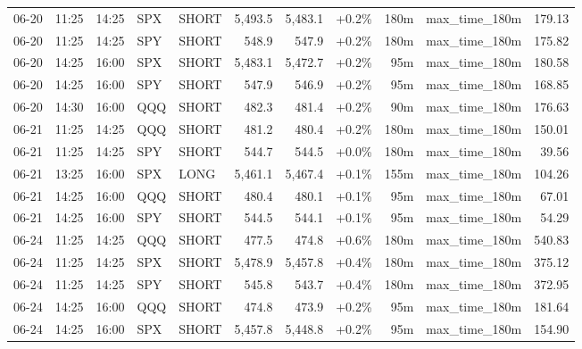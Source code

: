 \documentclass[11pt,a4paper,twoside]{article}
\begin{document}
\begin{center}
\begin{longtable}{>{\color{txtmain}}l l l l l r r r r >{\color{txtmain}}l r}
06-20 & 11:25 & 14:25 & SPX & SHORT & 5,493.5 & 5,483.1 & \textcolor{wingreen}{+0.2\%} & 180m & max\_time\_180m & \textcolor{wingreen}{179.13} \\
06-20 & 11:25 & 14:25 & SPY & SHORT & 548.9 & 547.9 & \textcolor{wingreen}{+0.2\%} & 180m & max\_time\_180m & \textcolor{wingreen}{175.82} \\
06-20 & 14:25 & 16:00 & SPX & SHORT & 5,483.1 & 5,472.7 & \textcolor{wingreen}{+0.2\%} & 95m & max\_time\_180m & \textcolor{wingreen}{180.58} \\
06-20 & 14:25 & 16:00 & SPY & SHORT & 547.9 & 546.9 & \textcolor{wingreen}{+0.2\%} & 95m & max\_time\_180m & \textcolor{wingreen}{168.85} \\
06-20 & 14:30 & 16:00 & QQQ & SHORT & 482.3 & 481.4 & \textcolor{wingreen}{+0.2\%} & 90m & max\_time\_180m & \textcolor{wingreen}{176.63} \\
06-21 & 11:25 & 14:25 & QQQ & SHORT & 481.2 & 480.4 & \textcolor{wingreen}{+0.2\%} & 180m & max\_time\_180m & \textcolor{wingreen}{150.01} \\
06-21 & 11:25 & 14:25 & SPY & SHORT & 544.7 & 544.5 & \textcolor{wingreen}{+0.0\%} & 180m & max\_time\_180m & \textcolor{wingreen}{39.56} \\
06-21 & 13:25 & 16:00 & SPX & LONG & 5,461.1 & 5,467.4 & \textcolor{wingreen}{+0.1\%} & 155m & max\_time\_180m & \textcolor{wingreen}{104.26} \\
06-21 & 14:25 & 16:00 & QQQ & SHORT & 480.4 & 480.1 & \textcolor{wingreen}{+0.1\%} & 95m & max\_time\_180m & \textcolor{wingreen}{67.01} \\
06-21 & 14:25 & 16:00 & SPY & SHORT & 544.5 & 544.1 & \textcolor{wingreen}{+0.1\%} & 95m & max\_time\_180m & \textcolor{wingreen}{54.29} \\
06-24 & 11:25 & 14:25 & QQQ & SHORT & 477.5 & 474.8 & \textcolor{wingreen}{+0.6\%} & 180m & max\_time\_180m & \textcolor{wingreen}{540.83} \\
06-24 & 11:25 & 14:25 & SPX & SHORT & 5,478.9 & 5,457.8 & \textcolor{wingreen}{+0.4\%} & 180m & max\_time\_180m & \textcolor{wingreen}{375.12} \\
06-24 & 11:25 & 14:25 & SPY & SHORT & 545.8 & 543.7 & \textcolor{wingreen}{+0.4\%} & 180m & max\_time\_180m & \textcolor{wingreen}{372.95} \\
06-24 & 14:25 & 16:00 & QQQ & SHORT & 474.8 & 473.9 & \textcolor{wingreen}{+0.2\%} & 95m & max\_time\_180m & \textcolor{wingreen}{181.64} \\
06-24 & 14:25 & 16:00 & SPX & SHORT & 5,457.8 & 5,448.8 & \textcolor{wingreen}{+0.2\%} & 95m & max\_time\_180m & \textcolor{wingreen}{154.90} \\

\end{longtable}
\end{center}
\end{document}
